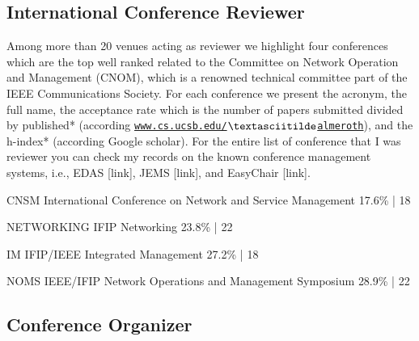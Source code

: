 \documentclass[print]{friggeri-cv} %
\begin{document}
\subsection{International Conference Reviewer}
Among more than 20 venues acting as reviewer we highlight four conferences which are the top well ranked related to the Committee on Network Operation and Management (CNOM), which is a renowned technical committee part of the IEEE Communications Society. For each conference we present the acronym, the full name, the acceptance rate which is the number of papers submitted divided by published* (according \href{http://www.cs.ucsb .edu/~almeroth/conf/stats}{\texttt{www.cs.ucsb.edu/$\textasciitilde$almeroth}}), and the h-index* (according Google scholar). For the entire list of conference that I was reviewer you can check my records on the known conference management systems, i.e., EDAS [link], JEMS [link], and EasyChair [link].

\begin{entrylist}

\vspace{-0.3cm}
\entry
{CNSM} %
{International Conference on Network and Service Management}
{17.6\% | 18}

\vspace{-0.3cm}
\entry
{NETWORKING} %
{IFIP Networking}
{23.8\% | 22 }

\vspace{-0.3cm}
\entry
{IM} %
{IFIP/IEEE Integrated Management}
{27.2\% | 18}

\vspace{-0.3cm}
\entry
{NOMS} %
{IEEE/IFIP Network Operations and Management Symposium }
{28.9\% | 22}


\end{entrylist}

\let\thefootnote\relax{}

\newpage
\subsection{Conference Organizer}
\end{document}
